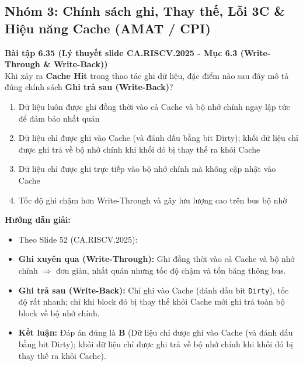 \subsection{Nhóm 3: Chính sách ghi, Thay thế, Lỗi 3C \& Hiệu năng Cache (AMAT / CPI)}

\textbf{Bài tập 6.35 (Lý thuyết slide CA.RISCV.2025 - Mục 6.3 (Write-Through \& Write-Back))}\\
Khi xảy ra \textbf{Cache Hit} trong thao tác ghi dữ liệu, đặc điểm nào sau đây mô tả đúng chính sách \textbf{Ghi trả sau (Write-Back)}?
\begin{enumerate}[label=\Alph*.]
    \item Dữ liệu luôn được ghi đồng thời vào cả Cache và bộ nhớ chính ngay lập tức để đảm bảo nhất quán
    \item Dữ liệu chỉ được ghi vào Cache (và đánh dấu bằng bit Dirty); khối dữ liệu chỉ được ghi trả về bộ nhớ chính khi khối đó bị thay thế ra khỏi Cache
    \item Dữ liệu chỉ được ghi trực tiếp vào bộ nhớ chính mà không cập nhật vào Cache
    \item Tốc độ ghi chậm hơn Write-Through và gây lưu lượng cao trên bus bộ nhớ
\end{enumerate}
\textbf{Hướng dẫn giải:}
\begin{itemize}
    \item Theo Slide 52 (CA.RISCV.2025):
    \item \textbf{Ghi xuyên qua (Write-Through):} Ghi đồng thời vào cả Cache và bộ nhớ chính $\Rightarrow$ đơn giản, nhất quán nhưng tốc độ chậm và tốn băng thông bus.
    \item \textbf{Ghi trả sau (Write-Back):} Chỉ ghi vào Cache (đánh dấu bit \texttt{Dirty}), tốc độ rất nhanh; chỉ khi block đó bị thay thế khỏi Cache mới ghi trả toàn bộ block về bộ nhớ chính.
    \item \textbf{Kết luận:} Đáp án đúng là \textbf{B} (Dữ liệu chỉ được ghi vào Cache (và đánh dấu bằng bit Dirty); khối dữ liệu chỉ được ghi trả về bộ nhớ chính khi khối đó bị thay thế ra khỏi Cache).
\end{itemize}


